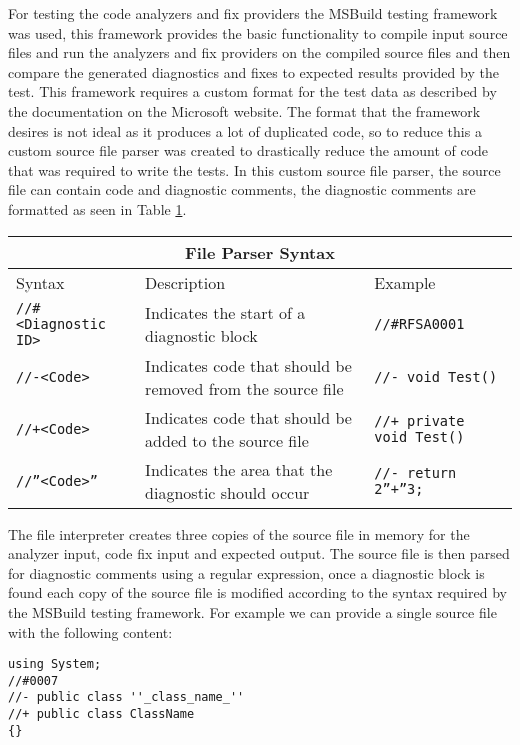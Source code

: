 For testing the code analyzers and fix providers the MSBuild testing framework was used, this framework provides the basic functionality to compile input source files and run the analyzers and fix providers on the compiled source files and then compare the generated diagnostics and fixes to expected results provided by the test.
This framework requires a custom format for the test data as described by the documentation on the Microsoft website. The format that the framework desires is not ideal as it produces a lot of duplicated code, so to reduce this a custom source file parser was created to drastically reduce the amount of code that was required to write the tests. In this custom source file parser, the source file can contain code and diagnostic comments, the diagnostic comments are formatted as seen in Table \ref{tab:FileParserSyntax}.
\begin{table}[H]
    \centering
    \label{tab:FileParserSyntax}
    \begin{tabular}{|p{3.5cm}|p{8cm}|p{4cm}|}
        \hline
        \multicolumn{3}{|c|}{File Parser Syntax} \\
        \hline
        Syntax&Description&Example\\
        \hline
        \texttt{//\#\textless Diagnostic ID\textgreater}&Indicates the start of a diagnostic block&\texttt{//\#RFSA0001}\\
        \texttt{//-\textless Code\textgreater}&Indicates code that should be removed from the source file&\texttt{//- void Test()}\\
        \texttt{//+\textless Code\textgreater}&Indicates code that should be added to the source file&\texttt{//+ private void Test()}\\
        \texttt{//''\textless Code\textgreater''}&Indicates the area that the diagnostic should occur&\texttt{//- return 2''+''3; }\\
        \hline
    \end{tabular}
\end{table}

The file interpreter creates three copies of the source file in memory for the analyzer input, code fix input and expected output. The source file is then parsed for diagnostic comments using a regular expression, once a diagnostic block is found each copy of the source file is modified according to the syntax required by the MSBuild testing framework.
For example we can provide a single source file with the following content:
\begin{lstlisting}[style=sharpc]
using System;
//#0007
//- public class ''_class_name_''
//+ public class ClassName
{}
\end{lstlisting}

